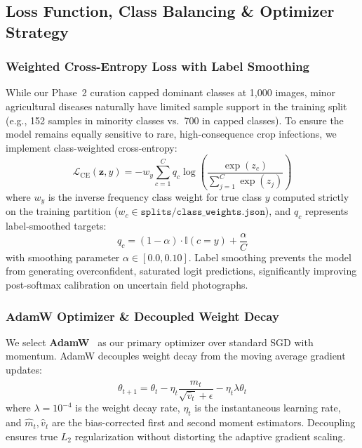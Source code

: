 \subsection{Loss Function, Class Balancing \& Optimizer Strategy}
\label{subsec:loss_optim}

\subsubsection{Weighted Cross-Entropy Loss with Label Smoothing}
While our Phase~2 curation capped dominant classes at 1,000 images, minor agricultural diseases naturally have limited sample support in the training split (e.g., 152 samples in minority classes vs.\ 700 in capped classes). To ensure the model remains equally sensitive to rare, high-consequence crop infections, we implement class-weighted cross-entropy:
\begin{equation}
    \mathcal{L}_{\text{CE}}(\mathbf{z}, y) = - w_y \sum_{c=1}^{C} q_c \log \left( \frac{\exp(z_c)}{\sum_{j=1}^{C} \exp(z_j)} \right)
\end{equation}
where $w_y$ is the inverse frequency class weight for true class $y$ computed strictly on the training partition ($w_c \in \texttt{splits/class\_weights.json}$), and $q_c$ represents label-smoothed targets:
\begin{equation}
    q_c = (1 - \alpha) \cdot \mathbb{I}(c = y) + \frac{\alpha}{C}
\end{equation}
with smoothing parameter $\alpha \in [0.0, 0.10]$. Label smoothing prevents the model from generating overconfident, saturated logit predictions, significantly improving post-softmax calibration on uncertain field photographs.

\subsubsection{AdamW Optimizer \& Decoupled Weight Decay}
We select \textbf{AdamW}~\cite{adamw} as our primary optimizer over standard SGD with momentum. AdamW decouples weight decay from the moving average gradient updates:
\begin{equation}
    \theta_{t+1} = \theta_t - \eta_t \frac{\hat{m}_t}{\sqrt{\hat{v}_t} + \epsilon} - \eta_t \lambda \theta_t
\end{equation}
where $\lambda = 10^{-4}$ is the weight decay rate, $\eta_t$ is the instantaneous learning rate, and $\hat{m}_t, \hat{v}_t$ are the bias-corrected first and second moment estimators. Decoupling ensures true $L_2$ regularization without distorting the adaptive gradient scaling.

